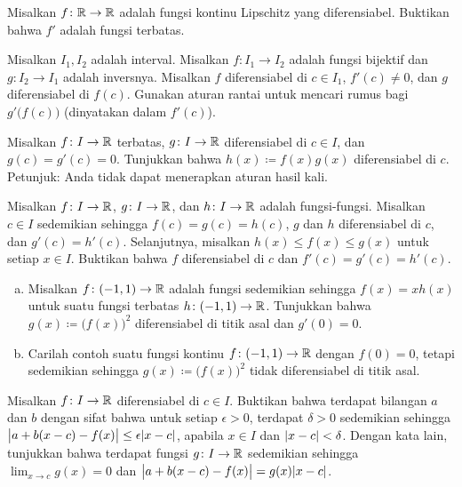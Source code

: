 \begin{exercise}
Misalkan $f \colon {\mathbb{R}} \to {\mathbb{R}}$ adalah fungsi kontinu Lipschitz yang
diferensiabel.
Buktikan bahwa $f'$ adalah fungsi terbatas.
\end{exercise}

\begin{exercise} \label{exercise:inversederformula}
Misalkan $I_1, I_2$ adalah interval.
Misalkan $f \colon I_1 \to I_2$ adalah fungsi bijektif dan $g \colon I_2 \to I_1$
adalah inversnya.  Misalkan $f$ diferensiabel di $c \in I_1$,
$f'(c) \neq 0$, dan $g$ diferensiabel di $f(c)$.  Gunakan aturan rantai
untuk mencari rumus bagi $g'\bigl(f(c)\bigr)$ (dinyatakan dalam $f'(c)$).
\end{exercise}

\begin{exercise} \label{exercise:bndmuldiff}
Misalkan $f \colon I \to {\mathbb{R}}$ terbatas, $g \colon I \to
{\mathbb{R}}$ diferensiabel di $c \in I$, dan $g(c) = g'(c) = 0$.  Tunjukkan
bahwa $h(x) \coloneqq f(x) g(x)$ diferensiabel di $c$.  Petunjuk: Anda
tidak dapat menerapkan aturan hasil kali.
\end{exercise}

\begin{exercise} \label{exercise:diffsqueeze}
Misalkan $f \colon I \to {\mathbb{R}}$, 
$g \colon I \to {\mathbb{R}}$, dan
$h \colon I \to {\mathbb{R}}$ adalah fungsi-fungsi.  Misalkan $c \in I$ sedemikian sehingga
$f(c) = g(c) = h(c)$, $g$ dan $h$ diferensiabel di $c$,
dan $g'(c) = h'(c)$.  Selanjutnya, misalkan $h(x) \leq f(x) \leq g(x)$ untuk
setiap $x \in I$.  Buktikan bahwa $f$ diferensiabel di $c$ dan $f'(c) = g'(c) =
h'(c)$.
\end{exercise}

\begin{exercise}
\leavevmode
\begin{enumerate}[a)]
\item
Misalkan $f \colon (-1,1) \to {\mathbb{R}}$ adalah fungsi sedemikian sehingga $f(x) = x h(x)$ untuk
suatu fungsi terbatas $h \colon (-1,1) \to {\mathbb{R}}$.
Tunjukkan bahwa $g(x) \coloneqq {\bigl( f(x) \bigr)}^2$
diferensiabel di titik asal dan $g'(0) = 0$.
\item
Carilah contoh suatu
fungsi kontinu $f \colon (-1,1) \to {\mathbb{R}}$ dengan $f(0) = 0$, tetapi sedemikian
sehingga $g(x) \coloneqq {\bigl( f(x) \bigr)}^2$ tidak diferensiabel di titik asal.
\end{enumerate}
\end{exercise}

\begin{exercise}
Misalkan $f \colon I \to {\mathbb{R}}$ diferensiabel di $c \in I$.
Buktikan bahwa terdapat bilangan $a$ dan $b$ dengan sifat bahwa
untuk setiap $\epsilon > 0$, terdapat $\delta > 0$ sedemikian sehingga
$\bigl\lvert {a+b(x-c) - f(x)} \bigr\rvert \leq \epsilon \lvert {x-c} \rvert$, apabila $x \in I$ dan
$\lvert {x-c} \rvert < \delta$.
Dengan kata lain, tunjukkan bahwa
terdapat fungsi $g \colon I \to {\mathbb{R}}$
sedemikian sehingga $\lim_{x\to c} g(x) = 0$ dan
$\bigl\lvert {a+b(x-c) - f(x)} \bigr\rvert = g(x) \lvert {x-c} \rvert$.
\end{exercise}

